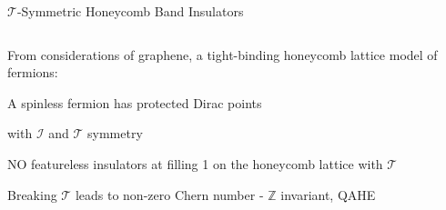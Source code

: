 \begin{frame}{$\mathcal{T}$-Symmetric Honeycomb Band Insulators}
\vskip-1.5cm
\begin{columns}
\begin{column}[T]{0.65\textwidth}
From considerations of graphene, a tight-binding honeycomb lattice model of fermions:

\bi
\item A spinless fermion has protected Dirac points
\bi
\item with $\mathcal{I}$ and $\mathcal{T}$ symmetry
\item NO featureless insulators at filling 1 on the honeycomb lattice with $\mathcal{T}$
\ei 
\item<2-> Breaking  $\mathcal{T}$ leads to non-zero Chern number - $\mathbb{Z}$ invariant, QAHE 


\end{column}
\end{columns}
\end{frame}
